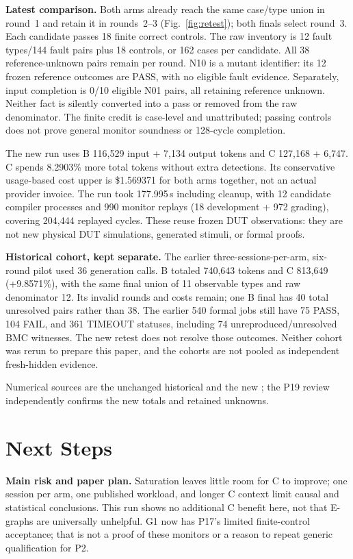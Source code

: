\documentclass[conference,10pt,letterpaper]{IEEEtran}
\begin{document}
\textbf{Latest comparison.} Both arms already reach the same case/type union in
round~1 and retain it in rounds~2--3 (Fig.~\ref{fig:retest}); both finals select
round~3. Each candidate passes 18 finite correct controls. The raw inventory is
12 fault types/144 fault pairs plus 18 controls, or 162 cases per candidate.
All 38 reference-unknown pairs remain per round. N10 is a mutant identifier:
its 12 frozen reference outcomes are PASS, with no eligible fault evidence.
Separately, input completion is 0/10 eligible N01 pairs, all retaining reference
unknown. Neither fact is silently converted into a pass or removed from the
raw denominator. The finite credit is case-level and unattributed; passing
controls does not prove general monitor soundness or 128-cycle completion.

The new run uses B 116,529 input + 7,134 output tokens and C 127,168 + 6,747.
C spends 8.2903\% more total tokens without extra detections. Its conservative
usage-based cost upper is \$1.569371 for both arms together, not an actual
provider invoice. The run took 177.995\,s including cleanup, with 12 candidate
compiler processes and 990 monitor replays (18 development + 972 grading),
covering 204,444 replayed cycles. These reuse frozen DUT observations: they are
not new physical DUT simulations, generated stimuli, or formal proofs.

\textbf{Historical cohort, kept separate.} The earlier three-sessions-per-arm,
six-round pilot used 36 generation calls. B totaled 740,643 tokens and C 813,649
(+9.8571\%), with the same final union of 11 observable types and raw denominator
12. Its invalid rounds and costs remain; one B final has 40 total unresolved
pairs rather than 38. The earlier 540 formal jobs still have 75 PASS, 104 FAIL,
and 361 TIMEOUT statuses, including 74 unreproduced/unresolved BMC witnesses.
The new retest does not resolve those outcomes. Neither cohort was rerun to
prepare this paper, and the cohorts are not pooled as independent fresh-hidden
evidence.

Numerical sources are the unchanged historical
 and the new
; the P19
review independently confirms the new totals and retained unknowns.

\section{Next Steps}
\textbf{Main risk and paper plan.} Saturation leaves little room for C to improve;
one session per arm, one published workload, and longer C context limit causal
and statistical conclusions. This run shows no additional C benefit here, not
that E-graphs are universally unhelpful. G1 now has P17's limited finite-control
acceptance; that is not a proof of these monitors or a reason to repeat generic
qualification for P2.
\end{document}
